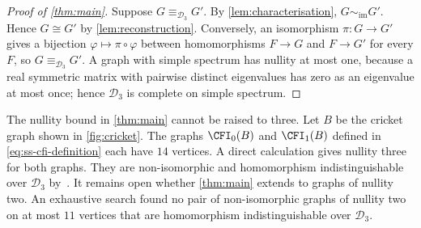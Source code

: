 \begin{proof}[Proof of \cref{thm:main}]

 Suppose $G\equiv_{\mathcal D_3}G'$. By \cref{lem:characterisation},
 $G\sim_{\mathrm{im}}G'$. Hence $G\cong G'$ by \cref{lem:reconstruction}.
 Conversely, an isomorphism $\pi:G\to G'$ gives a bijection
 $\varphi\mapsto\pi\circ\varphi$ between homomorphisms $F\to G$ and $F\to G'$
 for every $F$, so $G\equiv_{\mathcal D_3}G'$.
 A graph with simple spectrum has nullity at most one, because a real
 symmetric matrix with pairwise distinct eigenvalues has zero as an
 eigenvalue at most once; hence $\mathcal D_3$ is complete on simple
 spectrum.
\end{proof}

\begin{remark}\label{rem:nullity-bound}
The nullity bound in \cref{thm:main} cannot be raised to three.
Let $B$ be the cricket graph shown in \cref{fig:cricket}.
The graphs $\CFI_0(B)$ and $\CFI_1(B)$ defined in
\cref{eq:ss-cfi-definition} each have $14$ vertices.
A direct calculation gives nullity three for both graphs.
They are non-isomorphic and homomorphism indistinguishable over
$\mathcal D_3$ by~\cite[Corollary~3.7 and the proof of Corollary~4.2]{Roberson2026}.
It remains open whether \cref{thm:main} extends to graphs of nullity two.
An exhaustive search found no pair of non-isomorphic graphs of nullity two
on at most $11$ vertices that are homomorphism indistinguishable over
$\mathcal D_3$.
\end{remark}


